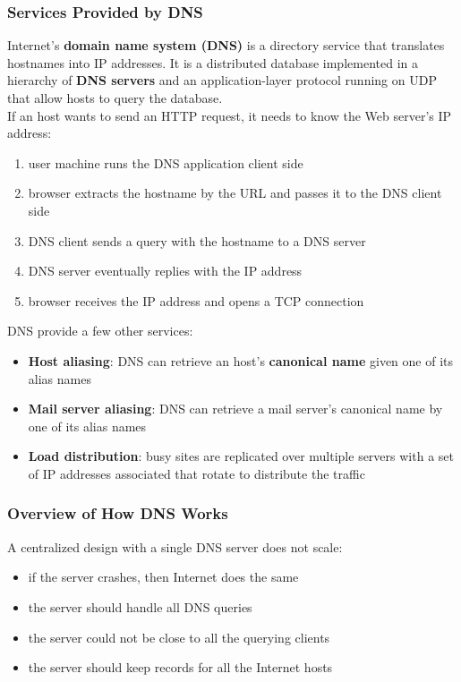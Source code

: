 \documentclass{article}
\begin{document}
\subsubsection{Services Provided by DNS}
Internet's \textbf{domain name system (DNS)} is a directory service that translates hostnames into IP addresses. It is a distributed database implemented in a hierarchy of \textbf{DNS servers} and an application-layer protocol running on UDP that allow hosts to query the database. \\
If an host wants to send an HTTP request, it needs to know the Web server's IP address:
\begin{enumerate}
    \item user machine runs the DNS application client side
    \item browser extracts the hostname by the URL and passes it to the DNS client side
    \item DNS client sends a query with the hostname to a DNS server
    \item DNS server eventually replies with the IP address
    \item browser receives the IP address and opens a TCP connection
\end{enumerate}
DNS provide a few other services:
\begin{itemize}
    \item \textbf{Host aliasing}: DNS can retrieve an host's \textbf{canonical name} given one of its alias names
    \item \textbf{Mail server aliasing}: DNS can retrieve a mail server's canonical name by one of its alias names
    \item \textbf{Load distribution}: busy sites are replicated over multiple servers with a set of IP addresses associated that rotate to distribute the traffic
\end{itemize}
\subsubsection{Overview of How DNS Works}
A centralized design with a single DNS server does not scale:
\begin{itemize}
    \item if the server crashes, then Internet does the same
    \item the server should handle all DNS queries
    \item the server could not be close to all the querying clients
    \item the server should keep records for all the Internet hosts
\end{itemize}
\end{document}
